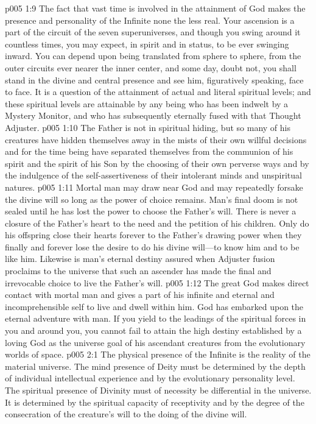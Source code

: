 \vs p005 1:9 The fact that vast time is involved in the attainment of God makes the presence and personality of the Infinite none the less real. Your ascension is a part of the circuit of the seven superuniverses, and though you swing around it countless times, you may expect, in spirit and in status, to be ever swinging inward. You can depend upon being translated from sphere to sphere, from the outer circuits ever nearer the inner center, and some day, doubt not, you shall stand in the divine and central presence and see him, figuratively speaking, face to face. It is a question of the attainment of actual and literal spiritual levels; and these spiritual levels are attainable by any being who has been indwelt by a Mystery Monitor, and who has subsequently eternally fused with that Thought Adjuster.
\pc \vs p005 1:10 The Father is not in spiritual hiding, but so many of his creatures have hidden themselves away in the mists of their own willful decisions and for the time being have separated themselves from the communion of his spirit and the spirit of his Son by the choosing of their own perverse ways and by the indulgence of the self\hyp{}assertiveness of their intolerant minds and unspiritual natures.
\vs p005 1:11 Mortal man may draw near God and may repeatedly forsake the divine will so long as the power of choice remains. Man’s final doom is not sealed until he has lost the power to choose the Father’s will. There is never a closure of the Father’s heart to the need and the petition of his children. Only do his offspring close their hearts forever to the Father’s drawing power when they finally and forever lose the desire to do his divine will---to know him and to be like him. Likewise is man’s eternal destiny assured when Adjuster fusion proclaims to the universe that such an ascender has made the final and irrevocable choice to live the Father’s will.
\vs p005 1:12 The great God makes direct contact with mortal man and gives a part of his infinite and eternal and incomprehensible self to live and dwell within him. God has embarked upon the eternal adventure with man. If you yield to the leadings of the spiritual forces in you and around you, you cannot fail to attain the high destiny established by a loving God as the universe goal of his ascendant creatures from the evolutionary worlds of space.
\vs p005 2:1 The physical presence of the Infinite is the reality of the material universe. The mind presence of Deity must be determined by the depth of individual intellectual experience and by the evolutionary personality level. The spiritual presence of Divinity must of necessity be differential in the universe. It is determined by the spiritual capacity of receptivity and by the degree of the consecration of the creature’s will to the doing of the divine will.

